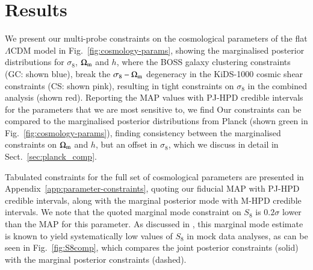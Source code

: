 \section{Results}
\label{sec:results}
We present our multi-probe constraints on the cosmological parameters of the flat $\Lambda$CDM model in Fig.~\ref{fig:cosmology-params}, showing the marginalised posterior distributions for $\sigma_8$, $\Omega_{\rm m}$ and $h$, where the BOSS galaxy clustering constraints (GC: shown blue), break the $\sigma_8-\Omega_{\rm m}$ degeneracy in the KiDS-1000 cosmic shear constraints (CS: shown pink), resulting in tight constraints on $\sigma_8$ in the combined \tttp analysis (shown red). 
Reporting the MAP values with PJ-HPD credible intervals for the parameters that we are most sensitive to, we find 
Our constraints can be compared to the marginalised posterior distributions from Planck (shown green in Fig.~\ref{fig:cosmology-params}), finding consistency between the marginalised constraints on $\Omega_{\rm m}$ and $h$, but an offset in $\sigma_8$,  which we discuss in detail in Sect.~\ref{sec:planck_comp}.

Tabulated constraints for the full set of cosmological parameters are presented in Appendix~\ref{app:parameter-constraints}, quoting our fiducial MAP with PJ-HPD credible intervals, along with the marginal posterior mode with M-HPD credible intervals. 
We note that the quoted marginal mode constraint on $S_8$ is $0.2\sigma$ lower than the MAP for this parameter. 
As discussed in \citet{joachimi/etal:inprep}, this marginal mode estimate is known to yield systematically low values of $S_8$ in mock data analyses, as can be seen in Fig.~\ref{fig:S8comp}, which compares the joint posterior constraints (solid) with the marginal posterior constraints (dashed).  

